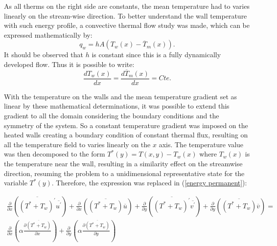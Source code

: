 \documentclass[10pt]{article} %
\begin{document}
As all therms on the right side are constants, the mean temperature had to varies linearly on the stream-wise direction.  
To better understand the wall temperature with such energy profile, a convective thermal flow study was made, which can be expressed mathematically by:
\begin{equation}
q_w = h A \left( T_w(x) - \overline{T}_m(x)\right).
\end{equation}
It should be observed that $h$ is constant since this is a fully dynamically developed flow. Thus it is possible to write:
\begin{equation}
\frac{d T_w(x)}{d x} = \frac{d \overline{T}_m(x)}{d x} = Cte.
\end{equation}	

With the temperature on the walls and the mean temperature gradient set as linear by these mathematical determinations, it was possible to extend this gradient to all the domain considering the boundary conditions and the symmetry of the system. So a constant temperature gradient was imposed on the heated walls creating a boundary condition of constant thermal flux, resulting on all the temperature field to varies linearly on the $x$ axis. The temperature value was then decomposed to the form $ T^\ast(y) = T(x,y) - T_w(x) $ where $T_w(x)$ is the temperature near the wall, resulting in a similarity effect on the streamwise direction, resuming the problem to a unidimensional representative state for the variable $T^\ast(y)$. Therefore, the expression was replaced in (\ref{energy permanent}):



\begin{equation}
\begin{split}
\frac{\partial{}}{\partial{x}} \left(\overline{(T^\ast + T_w)^\prime} \overline{ u^\prime}\right) + \frac{\partial{}}{\partial{x}}\left(\overline{(T^\ast + T_w)} \overline{u}\right)+ 
\frac{\partial{}}{\partial{y}} \left(\overline{(T^\ast + T_w)^\prime} \overline{ v^\prime}\right) + \frac{\partial{}}{\partial{y}}\left(\overline{(T^\ast + T_w)} \overline{v}\right) = \\
{\frac{\partial{}}{\partial{x}}} \left(\alpha {\frac{\partial{\overline{(T^\ast + T_w)}}}{\partial{x}}} \right) +
{\frac{\partial{}}{\partial{y}}} \left(\alpha {\frac{\partial{\overline{(T^\ast + T_w)}}}{\partial{y}}} \right) 
\end{split}
\end{equation}
\end{document}
